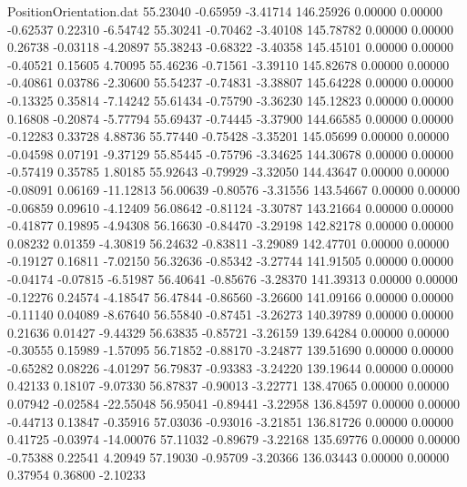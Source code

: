\begin{filecontents}{PositionOrientation.dat}
  55.23040   -0.65959   -3.41714   146.25926    0.00000    0.00000   -0.62537    0.22310   -6.54742
  55.30241   -0.70462   -3.40108   145.78782    0.00000    0.00000    0.26738   -0.03118   -4.20897
  55.38243   -0.68322   -3.40358   145.45101    0.00000    0.00000   -0.40521    0.15605    4.70095
  55.46236   -0.71561   -3.39110   145.82678    0.00000    0.00000   -0.40861    0.03786   -2.30600
  55.54237   -0.74831   -3.38807   145.64228    0.00000    0.00000   -0.13325    0.35814   -7.14242
  55.61434   -0.75790   -3.36230   145.12823    0.00000    0.00000    0.16808   -0.20874   -5.77794
  55.69437   -0.74445   -3.37900   144.66585    0.00000    0.00000   -0.12283    0.33728    4.88736
  55.77440   -0.75428   -3.35201   145.05699    0.00000    0.00000   -0.04598    0.07191   -9.37129
  55.85445   -0.75796   -3.34625   144.30678    0.00000    0.00000   -0.57419    0.35785    1.80185
  55.92643   -0.79929   -3.32050   144.43647    0.00000    0.00000   -0.08091    0.06169  -11.12813
  56.00639   -0.80576   -3.31556   143.54667    0.00000    0.00000   -0.06859    0.09610   -4.12409
  56.08642   -0.81124   -3.30787   143.21664    0.00000    0.00000   -0.41877    0.19895   -4.94308
  56.16630   -0.84470   -3.29198   142.82178    0.00000    0.00000    0.08232    0.01359   -4.30819
  56.24632   -0.83811   -3.29089   142.47701    0.00000    0.00000   -0.19127    0.16811   -7.02150
  56.32636   -0.85342   -3.27744   141.91505    0.00000    0.00000   -0.04174   -0.07815   -6.51987
  56.40641   -0.85676   -3.28370   141.39313    0.00000    0.00000   -0.12276    0.24574   -4.18547
  56.47844   -0.86560   -3.26600   141.09166    0.00000    0.00000   -0.11140    0.04089   -8.67640
  56.55840   -0.87451   -3.26273   140.39789    0.00000    0.00000    0.21636    0.01427   -9.44329
  56.63835   -0.85721   -3.26159   139.64284    0.00000    0.00000   -0.30555    0.15989   -1.57095
  56.71852   -0.88170   -3.24877   139.51690    0.00000    0.00000   -0.65282    0.08226   -4.01297
  56.79837   -0.93383   -3.24220   139.19644    0.00000    0.00000    0.42133    0.18107   -9.07330
  56.87837   -0.90013   -3.22771   138.47065    0.00000    0.00000    0.07942   -0.02584  -22.55048
  56.95041   -0.89441   -3.22958   136.84597    0.00000    0.00000   -0.44713    0.13847   -0.35916
  57.03036   -0.93016   -3.21851   136.81726    0.00000    0.00000    0.41725   -0.03974  -14.00076
  57.11032   -0.89679   -3.22168   135.69776    0.00000    0.00000   -0.75388    0.22541    4.20949
  57.19030   -0.95709   -3.20366   136.03443    0.00000    0.00000    0.37954    0.36800   -2.10233

\end{filecontents}
